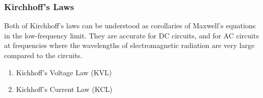 \documentclass[fleqn]{beamer} %
\newcommand{\sectionIIsubsectionIIItitle}{Kirchhoff's Laws}
\begin{document}
			\begin{frame}
				\frametitle{\sectionIIsubsectionIIItitle}

				Both of Kirchhoff's laws can be understood as corollaries of Maxwell's equations in the low-frequency limit. They are accurate for DC circuits, and for AC circuits at frequencies where the wavelengths of electromagnetic radiation are very large compared to the circuits. \vspc 

				\begin{enumerate}
				\item Kichhoff's Voltage Law (KVL)
				\item Kichhoff's Current  Law (KCL)
				\end{enumerate}

			\end{frame}
\end{document}
